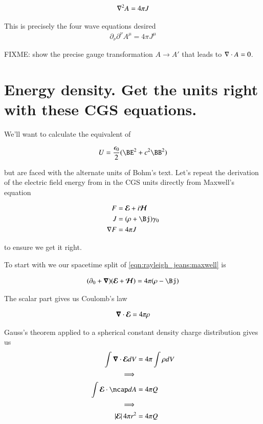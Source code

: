 \begin{align*}
\nabla^2 A = 4 \pi J
\end{align*}

This is precisely the four wave equations desired
\begin{align*}
\partial_\nu\partial^\nu A^\mu = 4 \pi J^\mu
\end{align*}

FIXME: show the precise gauge transformation $A \rightarrow A'$ that leads to $\nabla \cdot A = 0$.

\section{Energy density.  Get the units right with these CGS equations. }

We'll want to calculate the equivalent of 

\begin{align*}
U = \frac{\epsilon_0}{2} (\BE^2 + c^2 \BB^2)
\end{align*}

but are faced with the alternate units of Bohm's text.  Let's repeat the
derivation of the electric field energy from 
in the CGS units directly from Maxwell's equation

\begin{align}\label{eqn:rayleigh_jeans:maxwell}
F &= \EE + i\HH \\
J &= (\rho + \Bj) \gamma_0 \\
\grad F &= 4 \pi J
\end{align}

to ensure we get it right.

To start with we our spacetime split of \ref{eqn:rayleigh_jeans:maxwell} is

\begin{align*}
( \partial_0 + \spacegrad ) (\EE + \HH) = 4 \pi (\rho - \Bj)
\end{align*}

The scalar part gives us Coulomb's law

\begin{align}
\boldsymbol{\nabla} \cdot \boldsymbol{\mathcal{E}} = 4 \pi \rho 
\end{align}

Gauss's theorem applied to a spherical constant density charge distribution
gives us
\begin{align*}
\int \spacegrad \cdot \EE dV &= 4 \pi \int \rho dV \\
\implies \\
\int {\EE} \cdot \ncap dA &= 4 \pi Q \\
\implies \\
\Abs{\EE} 4 \pi r^2 &= 4 \pi Q \\
\end{align*}

